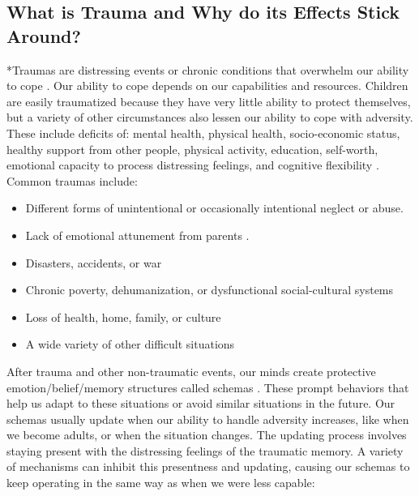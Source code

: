 \documentclass[12pt,letterpaper]{article}
\begin{document}
\subsection{What is Trauma and Why do its Effects Stick Around?}
*Traumas are distressing events or chronic conditions that overwhelm our ability to cope \cite{laneReconsolidation}. Our ability to cope depends on our capabilities and resources. Children are easily traumatized because they have very little ability to protect themselves, but a variety of other circumstances also lessen our ability to cope with adversity.  These include deficits of: mental health, physical health, socio-economic status, healthy support from other people, physical activity, education, self-worth, emotional capacity to process distressing feelings, and cognitive flexibility \cite{sayedRiskFactors,tangRiskFactors,trickeyRiskFactors}. Common traumas include:
\begin{itemize}
    \item Different forms of unintentional or occasionally intentional neglect or abuse.
    \item Lack of emotional attunement from parents \cite{brownAttachmentDisturbances}.
    \item Disasters, accidents, or war
    \item Chronic poverty, dehumanization, or dysfunctional social-cultural systems \cite{roncaStructuralViolence}
    \item Loss of health, home, family, or culture
    \item A wide variety of other difficult situations
\end{itemize}
After trauma and other non-traumatic events, our minds create protective emotion/belief/memory structures called schemas \cite{eckerUnlocking}. These prompt behaviors that help us adapt to these situations or avoid similar situations in the future. Our schemas usually update when our ability to handle adversity increases, like when we become adults, or when the situation changes. The updating process involves staying present with the distressing feelings of the traumatic memory. A variety of mechanisms can inhibit this presentness and updating, causing our schemas to keep operating in the same way as when we were less capable:
\end{document}
